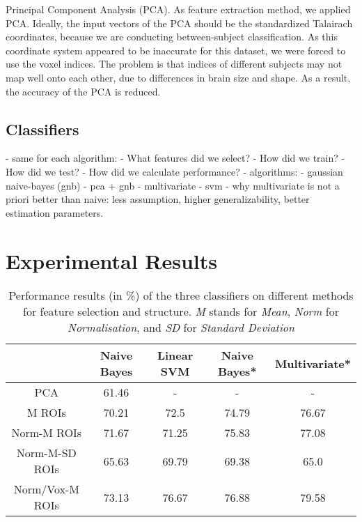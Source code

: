 \documentclass[preprint,journal,11pt]{vgtc}
\begin{document}
Principal Component Analysis (PCA). As feature extraction method, we applied PCA. Ideally, the input vectors of the PCA should be the standardized Talairach coordinates, because we are conducting between-subject classification. As this coordinate system appeared to be inaccurate for this dataset, we were forced to use the voxel indices. The problem is that indices of different subjects may not map well onto each other, due to differences in brain size and shape. As a result, the accuracy of the PCA is reduced.   


\subsection{Classifiers}



- same for each algorithm:
    - What features did we select?
    - How did we train?
    - How did we test?
        - How did we calculate performance?
- algorithms:
    - gaussian naive-bayes (gnb)
        - pca + gnb
    - multivariate
    - svm
    - why multivariate is not a priori better than naive: less assumption, higher generalizability, better estimation parameters. 



\section{Experimental Results}
\label{sec:results}

\begin{table*}[htpb]
\centering
{\small
\begin{tabular}{c|c|c|c|c}
& \textbf{Naive Bayes} & \textbf{Linear SVM} & \textbf{Naive Bayes*} & \textbf{Multivariate*} \\ \hline
PCA & 61.46 &  - & - & - \\
M ROIs & 70.21 & 72.5 & 74.79 & 76.67 \\
Norm-M ROIs & 71.67 & 71.25 & 75.83 & 77.08 \\
Norm-M-SD ROIs & 65.63 & 69.79 & 69.38 & 65.0 \\
Norm/Vox-M ROIs & 73.13 & 76.67 & 76.88 & 79.58 \\
\end{tabular}}
\caption{Performance results (in \%) of the three classifiers on different methods for feature selection and structure. \emph{M} stands for \emph{Mean}, \emph{Norm} for \emph{Normalisation}, and \emph{SD} for \emph{Standard Deviation}}
\label{tab:results}
\end{table*}
\end{document}
